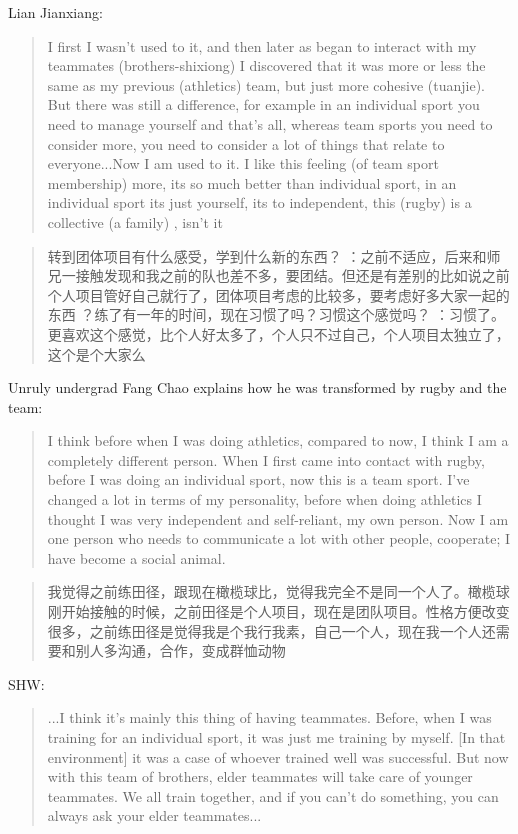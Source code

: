 \begin{CJK}{UTF8}{gbsn}
Lian Jianxiang:
\begin{quotation}
 I first I wasn’t used to it, and then later as began to interact with my teammates (brothers-shixiong) I discovered that it was more or less the same as my previous (athletics) team, but just more cohesive (tuanjie).  But there was still a difference, for example in an individual sport you need to manage yourself and that's all, whereas team sports you need to consider more, you need to consider a lot of things that relate to everyone...Now I am used to it. I like this feeling (of team sport membership) more, its so much better than individual sport, in an individual sport its just yourself, its to independent, this (rugby) is a collective  (a family) , isn’t it
\end{quotation}

  \begin{quotation}
    转到团体项目有什么感受，学到什么新的东西？
   ：之前不适应，后来和师兄一接触发现和我之前的队也差不多，要团结。但还是有差别的比如说之前个人项目管好自己就行了，团体项目考虑的比较多，要考虑好多大家一起的东西
   ？练了有一年的时间，现在习惯了吗？习惯这个感觉吗？
   ：习惯了。更喜欢这个感觉，比个人好太多了，个人只不过自己，个人项目太独立了，这个是个大家么
  \end{quotation}


Unruly undergrad Fang Chao explains how he was transformed by rugby and the team:

  \begin{quotation}
    I think before when I was doing athletics, compared to now, I think I am a completely different person.  When I first came into contact with rugby, before I was doing an individual sport, now this is a team sport. I've changed a lot in terms of my personality, before when doing athletics I thought I was very independent and self-reliant, my own person.  Now I am one person who needs to communicate a lot with other people, cooperate; I have become a social animal.
  \end{quotation}


    \begin{quotation}
      我觉得之前练田径，跟现在橄榄球比，觉得我完全不是同一个人了。橄榄球刚开始接触的时候，之前田径是个人项目，现在是团队项目。性格方便改变很多，之前练田径是觉得我是个我行我素，自己一个人，现在我一个人还需要和别人多沟通，合作，变成群恤动物
    \end{quotation}


  SHW:
  \begin{quotation}
    ...I think it's mainly this thing of having teammates. Before, when I was training for an individual sport, it was just me training by myself. [In that environment] it was a case of whoever trained well was successful.  But now with this team of brothers, elder teammates will take care of younger teammates. We all train together, and if you can’t do something, you can always ask your elder teammates...
  \end{quotation}


\end{CJK}
